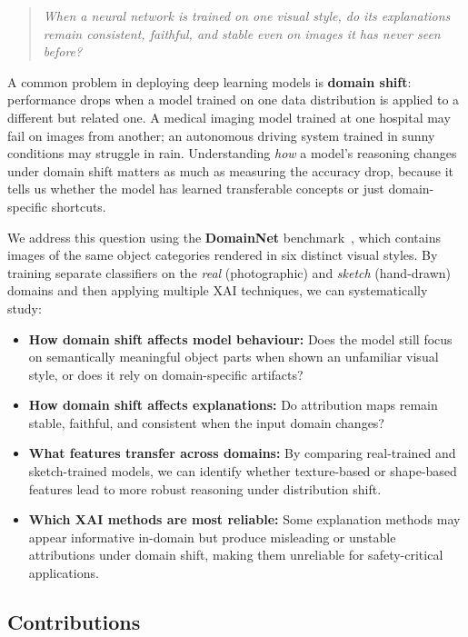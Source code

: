\documentclass[12pt, a4paper]{article}
\begin{document}
\begin{quote}
\emph{When a neural network is trained on one visual style, do its explanations
remain consistent, faithful, and stable even on images it has never seen
before?}
\end{quote}

A common problem in deploying deep learning models is \textbf{domain shift}:
performance drops when a model trained on one data distribution is applied to a
different but related one.  A medical imaging model trained at one hospital may
fail on images from another; an autonomous driving system trained in sunny
conditions may struggle in rain.  Understanding \emph{how} a model's reasoning
changes under domain shift matters as much as measuring the accuracy drop,
because it tells us whether the model has learned transferable concepts or just
domain-specific shortcuts.

We address this question using the \textbf{DomainNet} benchmark~\cite{domainnet},
which contains images of the same object categories rendered in six distinct
visual styles.  By training separate classifiers on the \textit{real}
(photographic) and \textit{sketch} (hand-drawn) domains and then applying
multiple XAI techniques, we can systematically study:

\begin{itemize}[leftmargin=*]
    \item \textbf{How domain shift affects model behaviour:} Does the model
          still focus on semantically meaningful object parts when shown an
          unfamiliar visual style, or does it rely on domain-specific artifacts?
    \item \textbf{How domain shift affects explanations:} Do attribution maps
          remain stable, faithful, and consistent when the input domain changes?
    \item \textbf{What features transfer across domains:} By comparing
          real-trained and sketch-trained models, we can identify whether
          texture-based or shape-based features lead to more robust reasoning
          under distribution shift.
    \item \textbf{Which XAI methods are most reliable:} Some explanation methods
          may appear informative in-domain but produce misleading or unstable
          attributions under domain shift, making them unreliable for safety-critical
          applications.
\end{itemize}

\subsection{Contributions}
\end{document}
